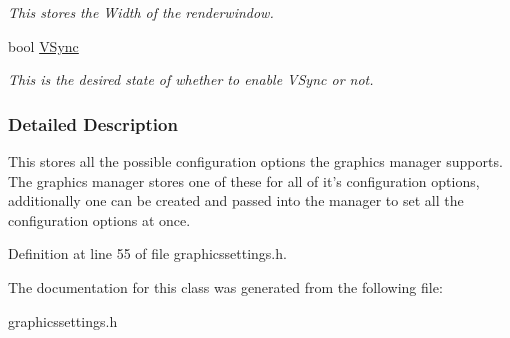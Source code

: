 \begin{DoxyCompactItemize}
\begin{DoxyCompactList}\small\item\em This stores the Width of the renderwindow. \item\end{DoxyCompactList}\item 
\hypertarget{structphys_1_1GraphicsSettings_ade8df051b7da492f0b48014edfca532a}{
bool \hyperlink{structphys_1_1GraphicsSettings_ade8df051b7da492f0b48014edfca532a}{VSync}}
\label{structphys_1_1GraphicsSettings_ade8df051b7da492f0b48014edfca532a}

\begin{DoxyCompactList}\small\item\em This is the desired state of whether to enable VSync or not. \item\end{DoxyCompactList}\end{DoxyCompactItemize}


\subsubsection{Detailed Description}
This stores all the possible configuration options the graphics manager supports. The graphics manager stores one of these for all of it's configuration options, additionally one can be created and passed into the manager to set all the configuration options at once. 

Definition at line 55 of file graphicssettings.h.



The documentation for this class was generated from the following file:\begin{DoxyCompactItemize}
\item 
graphicssettings.h\end{DoxyCompactItemize}
